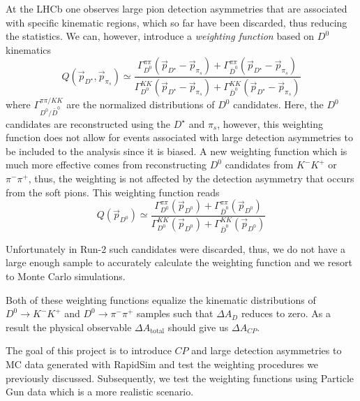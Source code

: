 \documentclass{article}
\begin{document}
        At the LHCb one observes large pion detection asymmetries that are associated with specific kinematic regions, which so far have been discarded, thus reducing the statistics.
        We can, however, introduce a \textit{weighting function} based on $D^0$ kinematics
        \begin{equation}
                \label{eq:weighting}
                Q(\vec{p}_{D^\star}, \vec{p}_{\pi_s}) \simeq \frac{\Gamma_{D^0}^{\pi\pi}(\vec{p}_{D^\star} - \vec{p}_{\pi_s}) + \Gamma_{\bar{D}^0}^{\pi\pi}(\vec{p}_{D^\star} - \vec{p}_{\pi_s})}{\Gamma_{D^0}^{KK}(\vec{p}_{D^\star} - \vec{p}_{\pi_s}) + \Gamma_{\bar{D}^0}^{KK}(\vec{p}_{D^\star} - \vec{p}_{\pi_s})}
        \end{equation}
        where $\Gamma_{D^{0}/\bar{D}^0}^{\pi\pi/KK}$ are the normalized distributions of $D^0$ candidates.
        Here, the $D^0$ candidates are reconstructed using the $D^\star$ and $\pi_s$, however, this weighting function does not allow for events associated with large detection asymmetries to be included to the analysis since it is biased.
        A new weighting function which is much more effective comes from reconstructing $D^0$ candidates from $K^-K^+$ or $\pi^-\pi^+$, thus, the weighting is not affected by the detection asymmetry that occurs from the soft pions.
        This weighting function reads
        \begin{equation}
                \label{eq:weighting}
                Q(\vec{p}_{D^0}) \simeq \frac{\Gamma_{D^0}^{\pi\pi}(\vec{p}_{D^0}) + \Gamma_{\bar{D}^0}^{\pi\pi}(\vec{p}_{D^0})}{\Gamma_{D^0}^{KK}(\vec{p}_{D^0}) + \Gamma_{\bar{D}^0}^{KK}(\vec{p}_{D^0})}
        \end{equation}

        Unfortunately in Run-2 such candidates were discarded, thus, we do not have a large enough sample to accurately calculate the weighting function and we resort to Monte Carlo simulations.

        Both of these weighting functions equalize the kinematic distributions of $D^0\to K^-K^+$ and $D^0\to \pi^-\pi^+$ samples such that $\Delta A_D$ reduces to zero.
        As a result the physical observable $\Delta A_\text{total}$ should give us $\Delta A_{CP}$.

        The goal of this project is to introduce $CP$ and large detection asymmetries to MC data generated with RapidSim and test the weighting procedures we previously discussed.
        Subsequently, we test the weighting functions using Particle Gun data which is a more realistic scenario.
\end{document}
